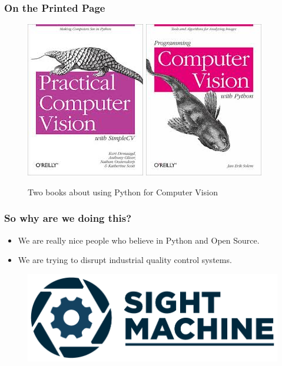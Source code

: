 \documentclass{beamer}
\begin{document}
\begin{frame}
\frametitle{On the Printed Page}

 \begin{figure}
     \includegraphics[width=0.4\linewidth]{SimpleCVBook.jpg}
     \quad
     \includegraphics[width=0.4\linewidth]{JanEricBook.jpg}
     \caption{Two books about using Python for Computer Vision}
 \end{figure}

\end{frame}

\begin{frame}
\frametitle{So why are we doing this?}

\begin{itemize}
  \item We are really nice people who believe in Python and Open
    Source.
  \item We are trying to disrupt industrial quality control systems.
\end{itemize}
\begin{figure}
  \includegraphics[width=0.6\linewidth]{SightMachineLogo.png}
\end{figure}

\end{frame}
\end{document}
